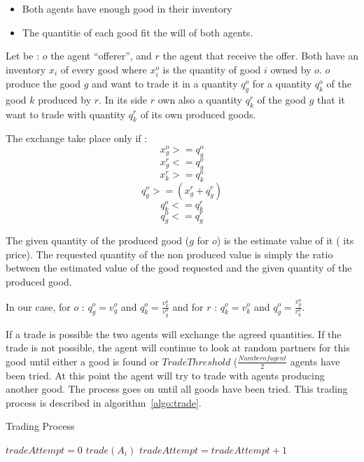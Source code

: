 \documentclass{wscpaperproc}
\begin{document}
\begin{itemize}
	\item Both agents have enough good in their inventory
	\item The quantitie of each good  fit the will of both agents.
\end{itemize}

Let be : $o$ the agent ``offerer'', and $r$ the agent that receive the offer. Both have an inventory $x_i$ of every good where $x_i^o$ is the quantity of good $i$ owned by $o$. $o$ produce the good $g$ and want to trade it in a quantity $q_g^o$ for a quantity $q_k^o$ of the good $k$ produced by $r$. 
In its side $r$ own also a quantity $q_k^r$ of the good $g$ that it want to trade with quantity $q_k^r$ of its own produced goods.

The exchange take place only if :
$$ x_g^o >= q_g^o $$
$$ x_g^r <= q_g^o $$
$$ x_k^r >= q_k^o $$
$$q_g^o>=(x_g^r+q_g^r)$$
$$q_k^o<=q_k^r$$
$$q_g^o<=q_g^r$$

The given quantity of the produced good ($g$ for $o$) is the estimate value of it ( its price). The requested quantity of the non produced value is simply the ratio between the estimated value of the good requested and the given quantity of the produced good.

In our case, for $o$ : $q_g^o = v_g^o$ and $q_k^o= \frac{v_k^o}{v_g^o} $ and for $r$  : $q_k^o = v_k^o$ and $q_g^o= \frac{v_g^o}{v_k^o} $.


If a trade is possible the two agents will exchange the agreed quantities. If the trade is not possible, the agent will continue to look at random partners for this good until either a good is found or $TradeThreshold$ ($\frac{Number of agent}{2}$ agents have been tried. At this point the agent will try to trade with agents producing another good. The process goes on until all goods have been tried. This trading process is described in algorithm~\ref{algo:trade}.

\begin{algorithm}
\caption{Trading Process}
\label{algo:trade}
	\begin{algorithmic}[1]
	\scriptsize
			\State $tradeAttempt = 0$
					\State $trade(A_i)$
				\Else
					\State $tradeAttempt = tradeAttempt + 1$					
				\EndIf
			\EndFor
		\EndFor
\end{algorithmic}
\end{algorithm}
\end{document}
